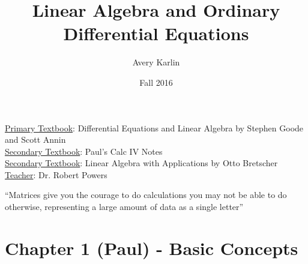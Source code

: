 \documentclass[11 pt, twoside]{article}
\begin{document}
\title{Linear Algebra and Ordinary Differential Equations}
\author{Avery Karlin}
\date{Fall 2016}
\newcommand{\textbook}{Differential Equations and Linear Algebra by Stephen Goode and Scott Annin}
\newcommand{\teacher}{Dr. Robert Powers}

\maketitle
\newpage
\hypertarget{content}{\tableofcontents}
\vspace{11pt}
\noindent
\underline{Primary Textbook}: \textbook\\
\underline{Secondary Textbook}: Paul's Calc IV Notes\\
\underline{Secondary Textbook}: Linear Algebra with Applications by Otto Bretscher
\underline{Teacher}: \teacher
\newpage

``Matrices give you the courage to do calculations you may not be able to do otherwise, representing a large amount of data as a single letter''

\section{Chapter 1 (Paul) - Basic Concepts}
\end{document}
